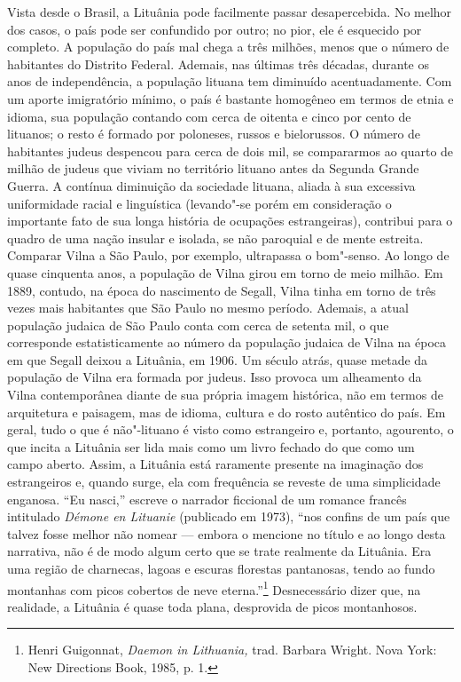 Vista desde o Brasil, a Lituânia pode facilmente passar desapercebida.
No melhor dos casos, o país pode ser confundido por outro; no pior, ele
é esquecido por completo. A população do país mal chega a três milhões,
menos que o número de habitantes do Distrito Federal. Ademais, nas
últimas três décadas, durante os anos de independência, a população
lituana tem diminuído acentuadamente. Com um aporte imigratório mínimo,
o país é bastante homogêneo em termos de etnia e idioma, sua população
contando com cerca de oitenta e cinco por cento de lituanos; o resto é
formado por poloneses, russos e bielorussos. O número de habitantes
judeus despencou para cerca de dois mil, se compararmos ao quarto de
milhão de judeus que viviam no território lituano antes da Segunda
Grande Guerra. A contínua diminuição da sociedade lituana, aliada à sua
excessiva uniformidade racial e linguística (levando"-se porém em
consideração o importante fato de sua longa história de ocupações
estrangeiras), contribui para o quadro de uma nação insular e isolada,
se não paroquial e de mente estreita. Comparar Vilna a São Paulo, por
exemplo, ultrapassa o bom"-senso. Ao longo de quase cinquenta anos, a
população de Vilna girou em torno de meio milhão. Em 1889, contudo, na
época do nascimento de Segall, Vilna tinha em torno de três vezes mais
habitantes que São Paulo no mesmo período. Ademais, a atual população
judaica de São Paulo conta com cerca de setenta mil, o que corresponde
estatisticamente ao número da população judaica de Vilna na época em que
Segall deixou a Lituânia, em 1906. Um século atrás, quase metade da
população de Vilna era formada por judeus. Isso provoca um alheamento da
Vilna contemporânea diante de sua própria imagem histórica, não em
termos de arquitetura e paisagem, mas de idioma, cultura e do rosto
autêntico do país. Em geral, tudo o que é não"-lituano é visto como
estrangeiro e, portanto, agourento, o que incita a Lituânia ser lida
mais como um livro fechado do que como um campo aberto. Assim, a
Lituânia está raramente presente na imaginação dos estrangeiros e,
quando surge, ela com frequência se reveste de uma simplicidade
enganosa. ``Eu nasci,'' escreve o narrador ficcional de um romance
francês intitulado \textit{Démone en Lituanie} (publicado em 1973), ``nos
confins de um país que talvez fosse melhor não nomear --- embora o
mencione no título e ao longo desta narrativa, não é de modo algum certo
que se trate realmente da Lituânia. Era uma região de charnecas, lagoas
e escuras florestas pantanosas, tendo ao fundo montanhas com picos
cobertos de neve eterna.''\footnote{Henri Guigonnat, \textit{Daemon in
  Lithuania,} trad. Barbara Wright. Nova York: New Directions Book,
  1985, p. 1.} Desnecessário dizer que, na realidade, a Lituânia é quase
toda plana, desprovida de picos montanhosos.

